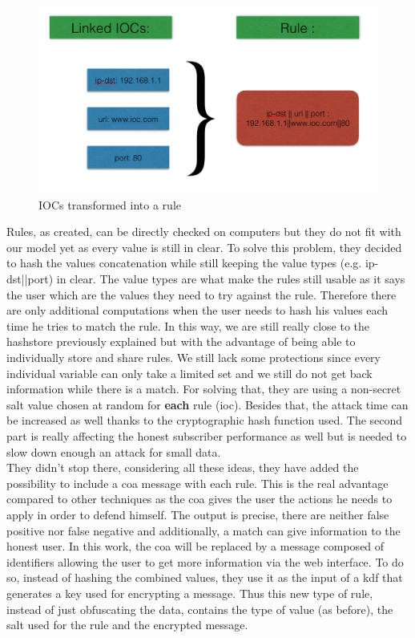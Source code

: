 \documentclass{eplmastersthesis}
\begin{document}
\begin{figure}[h!]
\begin{center}
	\includegraphics[scale=0.5]{res/ioc-rules}
	\caption{IOCs transformed into a rule}
	\label{IOC-To-Rule}
\end{center}
\end{figure}

Rules, as created, can be directly checked on computers but they do not fit with our model yet as every value is still in clear. To solve this problem, they decided to hash the values concatenation while still keeping the value types (e.g. ip-dst||port) in clear.
The value types are what make the rules still usable as it says the user which are the values they need to try against the rule.
Therefore there are only additional computations when the user needs to hash his values each time he tries to match the rule.
In this way, we are still really close to the hashstore previously explained but with the advantage of being able to individually store and share rules. We still lack some protections since every individual variable can only take a limited set and we still do not get back information while there is a match.
For solving that, they are using a non-secret salt value chosen at random for \textbf{each} rule (\gls{ioc}). Besides that, the attack time can be increased as well thanks to the cryptographic hash function used. The second part is really affecting the honest subscriber performance as well but is needed to slow down enough an attack for small data.\\

They didn't stop there, considering all these ideas, they have added the possibility to include a \gls{coa} message with each rule. This is the real advantage compared to other techniques as the \gls{coa} gives the user the actions he needs to apply in order to defend himself. The output is precise, there are neither false positive nor false negative and additionally, a match can give information to the honest user. In this work, the \gls{coa} will be replaced by a message composed of identifiers allowing the user to get more information via the web interface. To do so, instead of hashing the combined values, they use it as the input of a \gls{kdf} that generates a key used for encrypting a message.
Thus this new type of rule, instead of just obfuscating the data, contains the type of value (as before), the salt used for the rule and the encrypted message.\\
\end{document}
